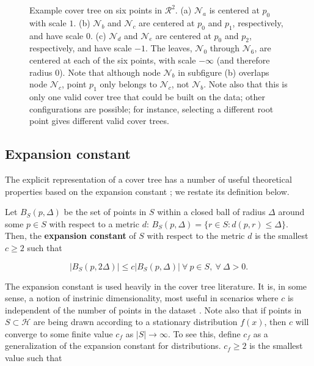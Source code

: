 \begin{figure}
  \vspace*{-0.5em}
\caption{Example cover tree on six points in $\mathcal{R}^2$.  (a)
$\mathscr{N}_a$ is centered at $p_0$ with scale $1$.  (b) $\mathscr{N}_b$ and
$\mathscr{N}_c$ are centered at $p_0$ and $p_1$, respectively, and have scale
$0$.  (c) $\mathscr{N}_d$ and $\mathscr{N}_e$ are centered at $p_0$ and $p_2$,
respectively, and have scale $-1$.  The leaves, $\mathscr{N}_0$ through
$\mathscr{N}_6$, are centered at each of the six points, with scale $-\infty$
(and therefore radius 0).  Note that although node $\mathscr{N}_b$ in subfigure
(b) overlaps node $\mathscr{N}_c$, point $p_1$ only belongs to $\mathscr{N}_c$,
not $\mathscr{N}_b$.  Note also that this is only one valid cover tree that
could be built on the data; other configurations are possible; for instance,
selecting a different root point gives different valid cover trees.}
\label{fig:example-cover-tree}
\end{figure}

\subsection{Expansion constant}

The explicit representation of a cover tree has a number of useful theoretical
properties based on the expansion constant \citep{karger2002finding}; we restate
its definition below.

\begin{defn}
\label{def:int_dim}
Let $B_S(p, \Delta)$ be the set of points in $S$ within a closed ball of radius
$\Delta$ around some $p \in S$ with respect to a metric $d$:
%
$B_S(p, \Delta) = \{ r \in S \colon d(p, r) \leq \Delta \}$.
%
Then, the {\bf expansion constant} of $S$ with respect to the metric $d$ is the
smallest $c \ge 2$ such that

\begin{equation}
| B_S(p, 2 \Delta) | \le c | B_S(p, \Delta) |\ \forall\ p \in S,\
\forall\ \Delta > 0.
\end{equation}

\end{defn}

The expansion constant is used heavily in the cover tree literature.  It is,
in some sense, a notion of instrinic dimensionality, most useful in scenarios
where $c$ is independent of the number of points in the dataset
\citep{karger2002finding, langford2006, krauthgamer2004navigating, ram2009}.
Note also that if points in $S \subset \mathcal{H}$ are being drawn according to
a stationary distribution $f(x)$, then $c$ will converge to some finite value
$c_f$ as $|S| \to \infty$.  To see this, define $c_f$ as a generalization of the
expansion constant for distributions.  $c_f \ge 2$ is the smallest value such
that

